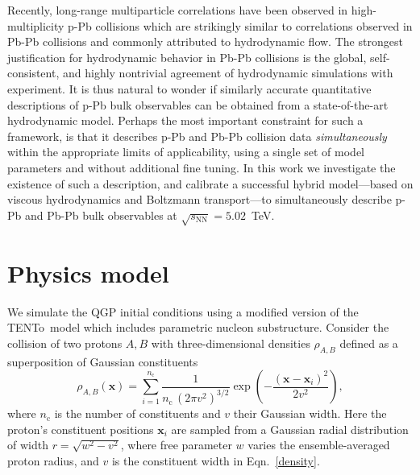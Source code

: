 \documentclass[3p,times,procedia,sort&compress]{elsarticle}
\newcommand{\trento}{T\raisebox{-0.3ex}{R}ENTo}
\newcommand{\sqrts}{\sqrt{s_\mathrm{NN}}}
\newcommand{\nc}{n_\mathrm{c}}
\begin{document}
Recently, long-range multiparticle correlations have been observed in high-multiplicity p-Pb collisions which are strikingly similar to correlations observed in Pb-Pb collisions and commonly attributed to hydrodynamic flow.
The strongest justification for hydrodynamic behavior in Pb-Pb collisions is the global, self-consistent, and highly nontrivial agreement of hydrodynamic simulations with experiment.
It is thus natural to wonder if similarly accurate quantitative descriptions of p-Pb bulk observables can be obtained from a state-of-the-art hydrodynamic model.
Perhaps the most important constraint for such a framework, is that it describes p-Pb and Pb-Pb collision data \emph{simultaneously} within the appropriate limits of applicability, using a single set of model parameters and without additional fine tuning.
In this work we investigate the existence of such a description, and calibrate a successful hybrid model---based on viscous hydrodynamics and Boltzmann transport---to simultaneously describe p-Pb and Pb-Pb bulk observables at $\sqrts=5.02$~TeV.

\section{Physics model}

We simulate the QGP initial conditions using a modified version of the \trento\ model \cite{Moreland:2014oya} which includes parametric nucleon substructure.
Consider the collision of two protons $A, B$ with three-dimensional densities $\rho_{A,B}$ defined as a superposition of Gaussian constituents
\begin{equation}
  \label{density}
  \rho_{A,B}(\textbf{x}) = \sum\limits_{i=1}^{\nc} \frac{1}{\nc\, (2 \pi v^2)^{3/2}} \exp\left(-\frac{(\textbf{x}-\textbf{x}_i)^2}{2 v^2}\right),
\end{equation}
where $\nc$ is the number of constituents and $v$ their Gaussian width.
Here the proton's constituent positions $\textbf{x}_i$ are sampled from a Gaussian radial distribution of width $r = \sqrt{w^2 - v^2}$, where free parameter $w$ varies the ensemble-averaged proton radius, and $v$ is the constituent width in Eqn.~\eqref{density}.
\end{document}
